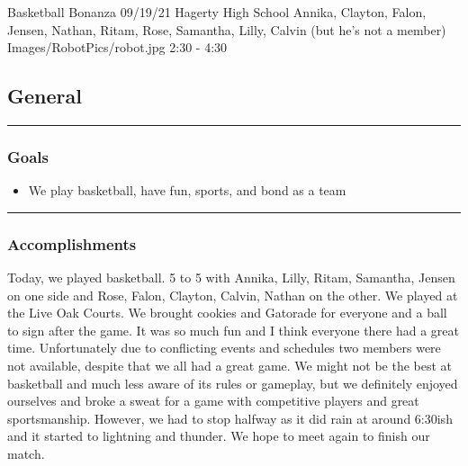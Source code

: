 \insertmeeting 
	{Basketball Bonanza} 
	{09/19/21}
	{Hagerty High School}
	{Annika, Clayton, Falon, Jensen, Nathan, Ritam, Rose, Samantha, Lilly, Calvin (but he’s not a member)}
	{Images/RobotPics/robot.jpg}
	{2:30 - 4:30}
	
\subsection*{General}
\noindent\hfil\rule{\textwidth}{.4pt}\hfil
\subsubsection*{Goals}
\begin{itemize}
    \item We play basketball, have fun, sports, and bond as a team  

\end{itemize} 

\noindent\hfil\rule{\textwidth}{.4pt}\hfil

\subsubsection*{Accomplishments}
Today, we played basketball. 5 to 5 with Annika, Lilly, Ritam, Samantha, Jensen on one side and Rose, Falon, Clayton, Calvin, Nathan on the other. We played at the Live Oak Courts. We brought cookies and Gatorade for everyone and a ball to sign after the game. It was so much fun and I think everyone there had a great time. Unfortunately due to conflicting events and schedules two members were not available, despite that we all had a great game.  We might not be the best at basketball and much less aware of its rules or gameplay, but we definitely enjoyed ourselves and broke a sweat for a game with competitive players and great sportsmanship. However, we had to stop halfway as it did rain at around 6:30ish and it started to lightning and thunder. We hope to meet again to finish our match. 



